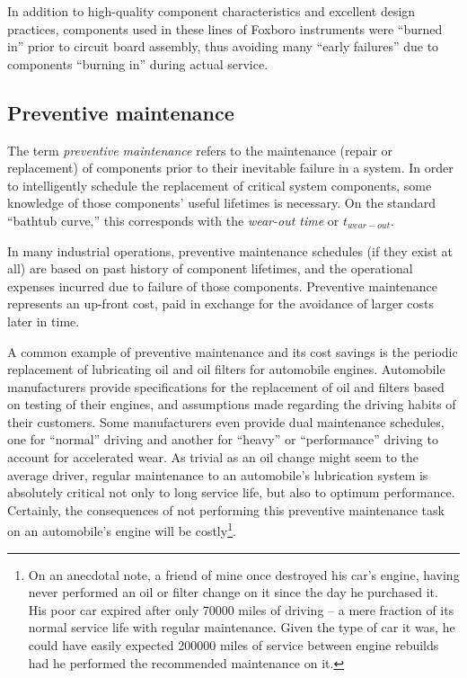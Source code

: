 In addition to high-quality component characteristics and excellent design practices, components used in these lines of Foxboro instruments were ``burned in'' prior to circuit board assembly, thus avoiding many ``early failures'' due to components ``burning in'' during actual service.  






\filbreak
\subsection{Preventive maintenance}

The term \textit{preventive maintenance} refers to the maintenance (repair or replacement) of components prior to their inevitable failure in a system.  In order to intelligently schedule the replacement of critical system components, some knowledge of those components' useful lifetimes is necessary.  On the standard ``bathtub curve,'' this corresponds with the \textit{wear-out time} or $t_{wear-out}$.  

In many industrial operations, preventive maintenance schedules (if they exist at all) are based on past history of component lifetimes, and the operational expenses incurred due to failure of those components.  Preventive maintenance represents an up-front cost, paid in exchange for the avoidance of larger costs later in time.

A common example of preventive maintenance and its cost savings is the periodic replacement of lubricating oil and oil filters for automobile engines.  Automobile manufacturers provide specifications for the replacement of oil and filters based on testing of their engines, and assumptions made regarding the driving habits of their customers.  Some manufacturers even provide dual maintenance schedules, one for ``normal'' driving and another for ``heavy'' or ``performance'' driving to account for accelerated wear.  As trivial as an oil change might seem to the average driver, regular maintenance to an automobile's lubrication system is absolutely critical not only to long service life, but also to optimum performance.  Certainly, the consequences of not performing this preventive maintenance task on an automobile's engine will be costly\footnote{On an anecdotal note, a friend of mine once destroyed his car's engine, having never performed an oil or filter change on it since the day he purchased it.  His poor car expired after only 70000 miles of driving -- a mere fraction of its normal service life with regular maintenance.  Given the type of car it was, he could have easily expected 200000 miles of service between engine rebuilds had he performed the recommended maintenance on it.}.

